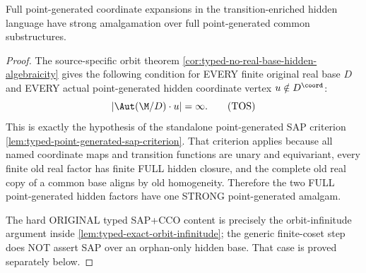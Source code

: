 \begin{proposition}
\label{prop:typed-coordinate-sap}
Full point-generated coordinate expansions in the transition-enriched hidden
language have strong amalgamation over full point-generated common
substructures.
\end{proposition}

\begin{proof}
The source-specific orbit theorem
\cref{cor:typed-no-real-base-hidden-algebraicity}
gives the following condition for EVERY finite original
real base $D$ and EVERY actual point-generated hidden
coordinate vertex $u\notin D^{\coord}$:
\[
             |\Aut(\M/D)\cdot u|=\infty .
 \tag{TOS}\label{eq:typed-coordinate-orbit-stabilizer}
\]
This is exactly the hypothesis of the standalone
point-generated SAP criterion
\cref{lem:typed-point-generated-sap-criterion}.
That criterion applies because all named coordinate maps and
transition functions are unary and equivariant, every finite
old real factor has finite FULL hidden closure, and the
complete old real copy of a common base aligns by
old homogeneity.  Therefore the two FULL point-generated
hidden factors have one STRONG point-generated amalgam.

The hard ORIGINAL typed SAP+CCO content is precisely
the orbit-infinitude argument inside
\cref{lem:typed-exact-orbit-infinitude}; the generic
finite-coset step does NOT assert SAP over an orphan-only
hidden base. That case is proved separately below.
\end{proof}

